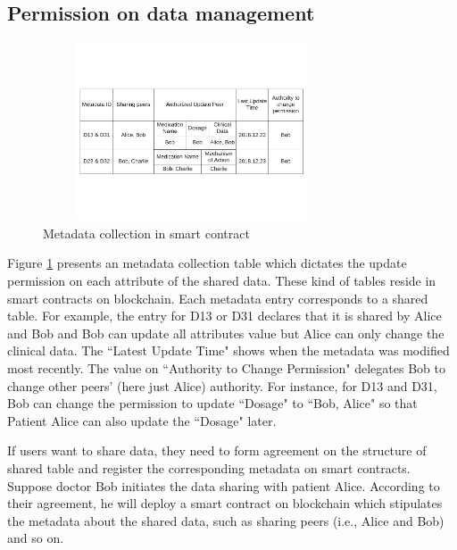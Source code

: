 \documentclass[conference]{IEEEtran}
\begin{document}
\subsection{Permission on data management}

\begin{figure}[htbp]
	\centerline{\includegraphics[width=250pt,height=150pt]{metadata.pdf}}
	\caption{Metadata collection in smart contract}
	\label{metadata}
\end{figure}

Figure \ref{metadata} presents an metadata collection table which dictates the update permission on each attribute of the shared data. These kind of tables reside in smart contracts on blockchain. Each metadata entry corresponds to a shared table. For example, the entry for D13 or D31 declares that it is shared by Alice and Bob and Bob can update all attributes value but Alice can only change the clinical data. The ``Latest Update Time" shows when the metadata was modified most recently. The value on ``Authority to Change Permission"  delegates Bob to change other peers' (here just Alice) authority. For instance, for D13 and D31, Bob can change the permission to update ``Dosage" to ``Bob, Alice" so that Patient Alice can also update the  ``Dosage" later.

If users want to share data, they need to form agreement on the structure of shared table and register the corresponding metadata on smart contracts. Suppose doctor Bob initiates the data sharing with patient Alice. According to their agreement, he will deploy a smart contract on blockchain which stipulates the metadata about the shared data, such as sharing peers (i.e., Alice and Bob) and so on. 


%
\end{document}
